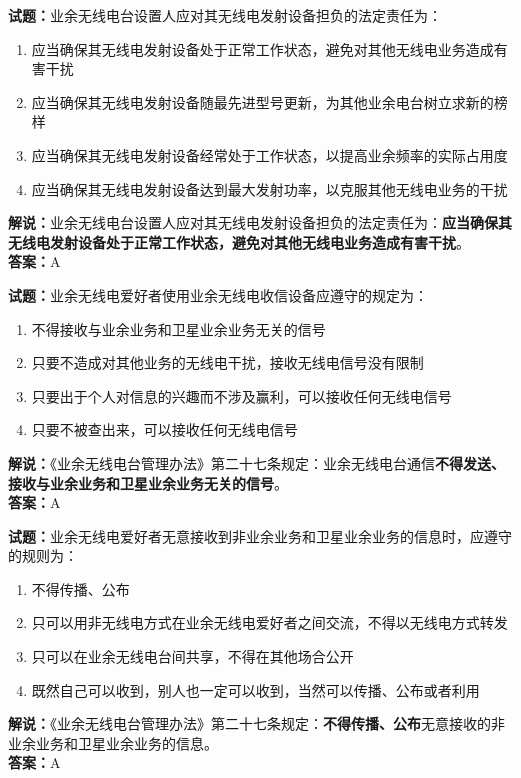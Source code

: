 \documentclass{ctexbook}
\begin{document}
\vspace{\baselineskip}

\noindent\textbf{试题：}业余无线电台设置人应对其无线电发射设备担负的法定责任为：
\begin{enumerate}[leftmargin=3em]
  \item 应当确保其无线电发射设备处于正常工作状态，避免对其他无线电业务造成有害干扰
  \item 应当确保其无线电发射设备随最先进型号更新，为其他业余电台树立求新的榜样
  \item 应当确保其无线电发射设备经常处于工作状态，以提高业余频率的实际占用度
  \item 应当确保其无线电发射设备达到最大发射功率，以克服其他无线电业务的干扰
\end{enumerate}
\noindent\textbf{解说：}业余无线电台设置人应对其无线电发射设备担负的法定责任为：\textbf{应当确保其无线电发射设备处于正常工作状态，避免对其他无线电业务造成有害干扰}。\\\noindent\textbf{答案：}A


\vspace{\baselineskip}

\noindent\textbf{试题：}业余无线电爱好者使用业余无线电收信设备应遵守的规定为：
\begin{enumerate}[leftmargin=3em]
  \item 不得接收与业余业务和卫星业余业务无关的信号
  \item 只要不造成对其他业务的无线电干扰，接收无线电信号没有限制
  \item 只要出于个人对信息的兴趣而不涉及赢利，可以接收任何无线电信号
  \item 只要不被查出来，可以接收任何无线电信号
\end{enumerate}
\noindent\textbf{解说：}《业余无线电台管理办法》第二十七条规定：业余无线电台通信\textbf{不得发送、接收与业余业务和卫星业余业务无关的信号}。\\\noindent\textbf{答案：}A

\vspace{\baselineskip}

\noindent\textbf{试题：}业余无线电爱好者无意接收到非业余业务和卫星业余业务的信息时，应遵守的规则为：
\begin{enumerate}[leftmargin=3em]
  \item 不得传播、公布
  \item 只可以用非无线电方式在业余无线电爱好者之间交流，不得以无线电方式转发
  \item 只可以在业余无线电台间共享，不得在其他场合公开
  \item 既然自己可以收到，别人也一定可以收到，当然可以传播、公布或者利用
\end{enumerate}
\noindent\textbf{解说：}《业余无线电台管理办法》第二十七条规定：\textbf{不得传播、公布}无意接收的非业余业务和卫星业余业务的信息。\\\noindent\textbf{答案：}A
\end{document}
